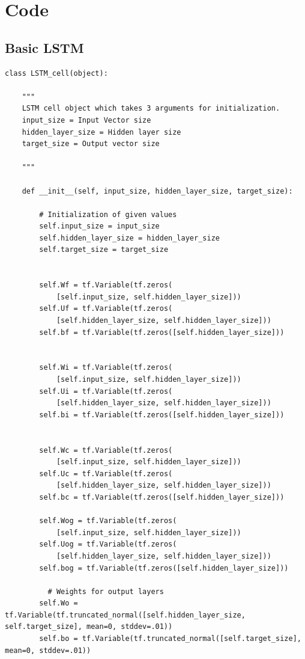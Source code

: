 \documentclass[12pt, letterpaper]{article}
\begin{document}
\section{Code}

\subsection{Basic LSTM}
\begin{verbatim}
class LSTM_cell(object):

    """
    LSTM cell object which takes 3 arguments for initialization.
    input_size = Input Vector size
    hidden_layer_size = Hidden layer size
    target_size = Output vector size

    """

    def __init__(self, input_size, hidden_layer_size, target_size):

        # Initialization of given values
        self.input_size = input_size
        self.hidden_layer_size = hidden_layer_size
        self.target_size = target_size


        self.Wf = tf.Variable(tf.zeros(
            [self.input_size, self.hidden_layer_size]))
        self.Uf = tf.Variable(tf.zeros(
            [self.hidden_layer_size, self.hidden_layer_size]))
        self.bf = tf.Variable(tf.zeros([self.hidden_layer_size]))        

        
        self.Wi = tf.Variable(tf.zeros(
            [self.input_size, self.hidden_layer_size]))
        self.Ui = tf.Variable(tf.zeros(
            [self.hidden_layer_size, self.hidden_layer_size]))
        self.bi = tf.Variable(tf.zeros([self.hidden_layer_size]))        

        
        self.Wc = tf.Variable(tf.zeros(
            [self.input_size, self.hidden_layer_size]))
        self.Uc = tf.Variable(tf.zeros(
            [self.hidden_layer_size, self.hidden_layer_size]))
        self.bc = tf.Variable(tf.zeros([self.hidden_layer_size]))
        
        self.Wog = tf.Variable(tf.zeros(
            [self.input_size, self.hidden_layer_size]))
        self.Uog = tf.Variable(tf.zeros(
            [self.hidden_layer_size, self.hidden_layer_size]))
        self.bog = tf.Variable(tf.zeros([self.hidden_layer_size]))
        
          # Weights for output layers
        self.Wo = tf.Variable(tf.truncated_normal([self.hidden_layer_size, self.target_size], mean=0, stddev=.01))
        self.bo = tf.Variable(tf.truncated_normal([self.target_size], mean=0, stddev=.01))
        

\end{verbatim}
\end{document}

